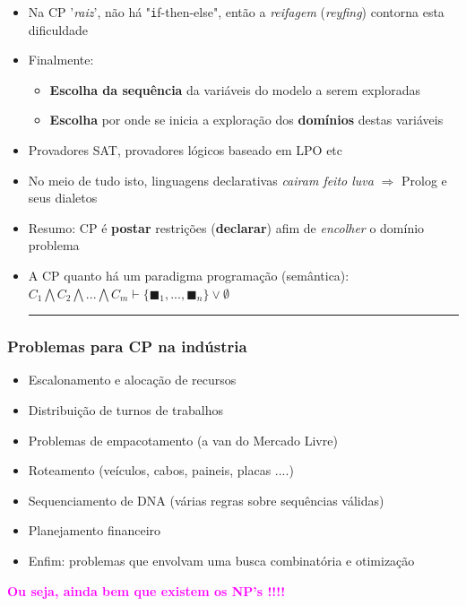 \documentclass{beamer}
\begin{document}
\begin{frame}[fragile, allowframebreaks=0.9]
  \begin{itemize}    
    
    \item Na CP '{\em raiz}', não há  "{\texttt if-then-else}", então a {\em reifagem} ({\em reyfing}) contorna esta dificuldade
        
    \item Finalmente:
    \begin{itemize}
        \item {\bf Escolha da sequência} da variáveis do modelo a serem exploradas
        \item {\bf Escolha} por onde se inicia a exploração dos {\bf domínios} destas variáveis
    \end{itemize}
    
  
    \item Provadores SAT, provadores lógicos baseado em LPO etc
    
    \item No meio de tudo isto, linguagens declarativas {\em cairam feito luva} $\Rightarrow$ Prolog e seus dialetos
    
    \item Resumo: CP é {\bf postar} restrições ({\bf declarar}) afim de {\em encolher} o domínio problema
    
    \item A CP quanto  há um paradigma programação (semântica):\\ $C_1 \bigwedge C_2 \bigwedge ...\bigwedge C_m \vdash \{\blacksquare_1 , ..., \blacksquare_n \} \vee \emptyset $ \\
    \noindent \textcolor{magenta}{ \rule{6cm}{10pt} }

  \end{itemize}

\end{frame}


\begin{frame}[fragile]

\frametitle{Problemas para CP na indústria}

\begin{itemize}
    \item Escalonamento e alocação de recursos
    \item Distribuição de turnos de trabalhos 
    \item Problemas de empacotamento (a van do Mercado Livre)
    \item Roteamento (veículos, cabos, paineis, placas ....)
    \item Sequenciamento de DNA (várias regras sobre sequências válidas)
    \item Planejamento financeiro
    \item Enfim: problemas que envolvam uma busca combinatória e otimização 
\end{itemize}

{\bf \textcolor{magenta}{Ou seja, ainda bem que existem os NP's !!!!}}
 
\end{frame}
\end{document}
